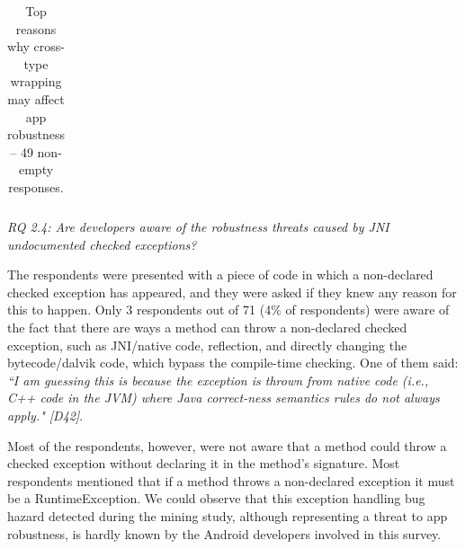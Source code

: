 {\begin{table}
\begin{tabular}{lrr}
\hline
\end{tabular}
\caption{Top reasons why cross-type wrapping may affect app robustness -- 49 non-empty responses. }
\label{tab:robustness}
\end{table}

\bigskip
\noindent\emph{RQ 2.4: Are developers aware of the robustness threats caused by JNI undocumented checked exceptions?}
\bigskip

The respondents were presented with a piece of code in which a non-declared checked exception has appeared, and they were asked if they knew any reason for this to happen. Only 3 respondents out of 71 (4\% of respondents) were aware of the fact that there are ways a method can throw a non-declared checked exception, such as JNI/native code, reflection, and directly changing the bytecode/dalvik code, which bypass the compile-time checking. One of them said: \emph{``I am guessing this is because the exception is thrown from native code (i.e., C++ code in the JVM) where Java correct-ness semantics rules do not always apply." [D42]}.

Most of the respondents, however, were not aware that a method could throw a checked exception without declaring it in the method's signature. Most respondents mentioned that if a method throws a non-declared exception it must be a RuntimeException. We could observe that this exception handling bug hazard detected during the mining study, although representing a threat to app robustness, is hardly known by the Android developers involved in this survey.

\bigskip


\bigskip


}
